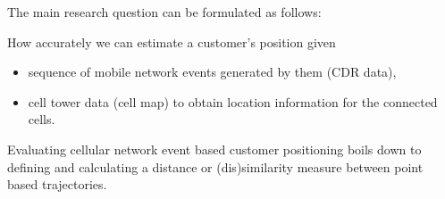 The main research question can be formulated as follows:

How accurately we can estimate a customer's position given
\begin{itemize}
    \item sequence of mobile network events generated by them (CDR data),
    \item cell tower data (cell map) to obtain location information for the connected cells.
\end{itemize}

Evaluating cellular network event based customer positioning boils down to defining and calculating a distance or (dis)similarity measure between point based trajectories.

\printnomenclature





